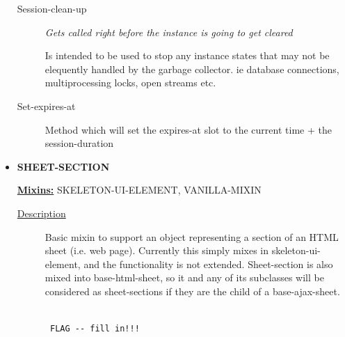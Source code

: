 \documentclass [11pt]{book}
\begin{document}
\begin{itemize}
\begin{description}
\item [Session-clean-up]
\emph{Gets called right before the instance is going to get cleared}

 Is intended to be used to stop any instance states that may not be elequently handled by the garbage collector. ie database connections, multiprocessing locks, open streams etc.




\item [Set-expires-at]

Method which will set the expires-at slot to the current time + the session-duration




\end{description}







\item {}
\label{prim:sheet-section}
\textbf{SHEET-SECTION}


\textbf{
\underline{Mixins:}} SKELETON-UI-ELEMENT, VANILLA-MIXIN





\begin{description}

\item [
\underline{Description}]


Basic mixin to support an object 
representing a section of an HTML sheet (i.e. web page). Currently 
this simply mixes in skeleton-ui-element, and the functionality is not 
extended. Sheet-section is also mixed into base-html-sheet, so it and 
any of its subclasses will be considered as sheet-sections if they 
are the child of a base-ajax-sheet.





\end{description}




\begin{figure}
\begin{lrbox}{\boxedverb}
\begin{minipage}{\linewidth}
{\small

\begin{verbatim}

 FLAG -- fill in!!!




\end{verbatim}}
\end{minipage}
\end{lrbox}
\end{figure}
\end{itemize}
\end{document}
